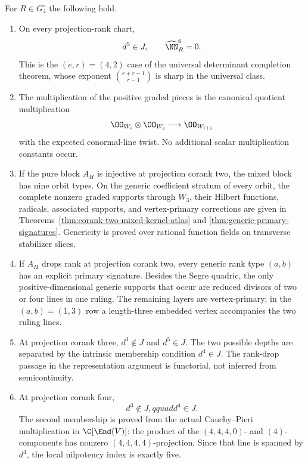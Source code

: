 \begin{theorem}
\label{thm:main-depth}
For \(R\in G_4^\circ\) the following hold.
\begin{enumerate}
\item On every projection-rank chart,
\[
 d^5\in J,\qquad \widehat\NN_R^6=0.
\]
This is the \((e,r)=(4,2)\) case of the universal determinant
completion theorem, whose exponent
\(\binom{e+r-1}{r-1}\) is sharp in the universal class.

\item The multiplication of the positive graded pieces is the
canonical quotient multiplication
\[
 \OO_{W_i}\otimes\OO_{W_j}\longrightarrow\OO_{W_{i+j}}
\]
with the expected conormal-line twist.  No additional scalar
multiplication constants occur.

\item If the pure block \(A_H\) is injective at projection corank
two, the mixed block has nine orbit types.  On the generic
coefficient stratum of every orbit, the complete nonzero graded
supports through \(W_3\), their Hilbert functions, radicals,
associated supports, and vertex-primary corrections are given in
Theorems~\ref{thm:corank-two-mixed-kernel-atlas} and
\ref{thm:generic-primary-signatures}.  Genericity is proved over
rational function fields on transverse stabilizer slices.

\item If \(A_H\) drops rank at projection corank two, every
generic rank type \((a,b)\) has an explicit primary signature.
Besides the Segre quadric, the only positive-dimensional generic
supports that occur are reduced divisors of two or four lines in one
ruling.  The remaining layers are vertex-primary; in the
\((a,b)=(1,3)\) row a length-three embedded vertex accompanies
the two ruling lines.

\item At projection corank three, \(d^3\notin J\) and
\(d^5\in J\).  The two possible depths are separated by the
intrinsic membership condition \(d^4\in J\).  The rank-drop
passage in the representation argument is functorial, not inferred
from semicontinuity.

\item At projection corank four,
\[
 d^3\notin J,qquad d^4\in J.
\]
The second membership is proved from the actual Cauchy--Pieri
multiplication in \(\C[\End(V)]\): the product of the
\((4,4,4,0)\)- and \((4)\)-components has nonzero
\((4,4,4,4)\)-projection.  Since that line is spanned by
\(d^4\), the local nilpotency index is exactly five.
\end{enumerate}
\end{theorem}

